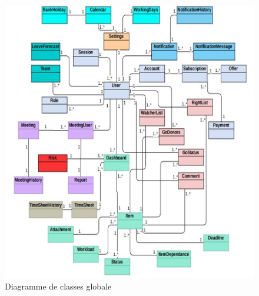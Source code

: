 \begin{figure}
    \centering
    \includegraphics{figures/33anis.png}
    \caption{Diagramme de classes globale}
    \label{fig:class_global}
\end{figure}
\newpage

